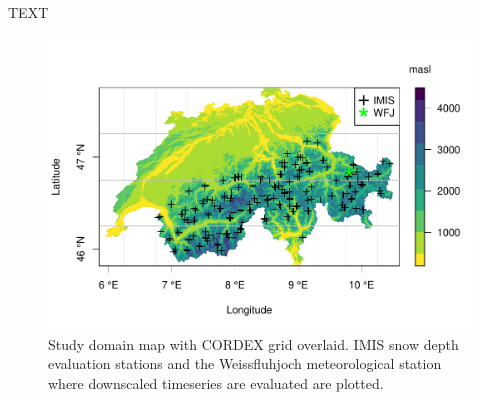 \documentclass[hess, manuscript]{copernicus}
\begin{document}

\begin{acknowledgements}
TEXT
\end{acknowledgements}


















%
 \clearpage

\begin{figure}[t]
\includegraphics[width=18cm]{"plots/F1_map3.pdf"}
\caption{Study domain map with CORDEX grid overlaid. IMIS snow depth evaluation stations and the Weissfluhjoch meteorological station where downscaled timeseries are evaluated are plotted.}
\end{figure}
\end{document}
